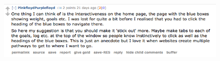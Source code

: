 \documentclass[titlepage,a4paper,11pt,oneside]{book} %
\begin{document}
\begin{appendices}
\begin{figure}[!ht]
\centering
\includegraphics[scale=0.6]{chapters/apendix/user6}
\end{figure}
\end{appendices}
\end{document}
